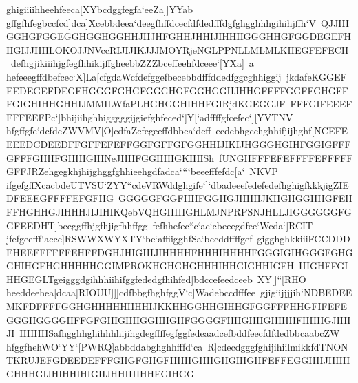 {{{ ghigiiiihheehfeeca[XYbcdggfegfa`eeZa]]YYab}
 \hbox{gffgfhfegbccfcd]dca]Xcebbdeea`deegfhffdcecfdfdedfffdgfghgghhhgihihjffh`V%
 QJJIHGGHGFGGEGGHGGHGGHHJIIJHFGHHJHHIJIHHIIGGGHHGFGGDEGEFHHGIJJIIHLOKOJJNVccRIJIJIKJJJMOYRjeNGLPPNLLMLMLKIIEGFEFECH%
 defhgjikiiihjgfegfhhikijffgheebbZZZbceffeehfdceee`[YXa]%
 a}
 \hbox{hefeeegffdbefcec`X]La[cfgdaWcfdefggefbecebbdfffddedfggcghhiggij%
 jkdafeKGGEFEEDEGEFDEGFHGGGFGHGFGGGHGFGGHGGIIJHHGFFFFGGFFGHGFFFGIGHIHHGHHIJMMILWfaPLHGHGGHIHHFGIRjdKGEGGJF%
 FFFGIFEEEFFFFEEFPc`]bhijiihghhigggggijgiefghfeced`]Y[`adffffgfcefec`][YVTNV}
 \hbox{hfgffgfe`dcfdcZWVMV[O]cdfaZcfegeeffdbbea`deff%
 ecdebhgcchghhifjijhghf[NCEFEEEEDCDEEDFFGFFEFEFFGGFGFFGFGGHHIJIKIJHGGGHGIHFGGIGFFFGFFFGHHFGHHIGIHNeJHHFGGHHIGKIHISh%
 fUNGHFFFEFEFFFFEFFFFFGFFJRZehgegkhjhijghggfghhieehgdfadca````beeefffefdc[a`%
 NKVP}
 \hbox{ifgefgffXcacbdeUTVSU`ZYY``cdeVRWddghgife`]`dbadeeefedefedefhghigfkkkjigZIEDFEEEGFFFFEFGFHG%
 GGGGGFGGFIIHFGGIIGJIIHHJKHGHGGHIIGFEHFFHGHHGJIHHHJIJIHIKQebVQHGIIIIIGHLMJNPRPSNJHLLJIGGGGGGFGGFEEDHT]bccggffhjgfhjigfhhffgg%
 fefhhefec``c`ac`cbeeegdfee`Wcda`]RCIT}
 \hbox{jfefgeefff`accc]RSWWXWYXTY`be`affiigghfSa`bccddffffgef%
 gigghghkkiiiFCCDDDEHEEFFFFFFEHFFDGHJHIGIIIJIHHHHFHHHIHHHHFGGGIGIHGGGFGHGGHIHGFHGHHHHHGGIMPROKHGHGHGHHHIHHGIGHHIGFH%
 IIIGHFFGIHHGEGLTgeigggdgihhhiihifggfededgfhihfed]bdccefeedceeb%
 XY[]``[RHO}
 \hbox{heeddeehea[dcaa]RIOUU]]]cdfbbgfhghfggV`c]Wadebccdfffee%
 gjigiijjjjih`NDBEDEEMKFDFFFFGGHGHHHHHIIHHIJKKHHGGHHGIHHGFGGFFFHHGFIFEFEGGGHGGGGHFFGFGHIGHHGGHHGHFGGGGFHHGHHGHIHHFHHHGJIHIJI%
 HHHIISafhgghhghihhhhijihgdegffffegfggfedeaadcefbddfeecfdfdedbbcaabcZW}
 \hbox{hfggfhehWO`YY`[PWRQ]abbddabghghhfffd`ca%
 R]cdecdgggfghijihiilmikkfdTNONTKRUJEFGDEEDEFFFGHGFGHGFHHHGHHGHGIHGHFEFFEGGIIIIJHHHGHHHGIJHIHHIHIGIIJHHIIIIHHEGIHGG%
}}}
